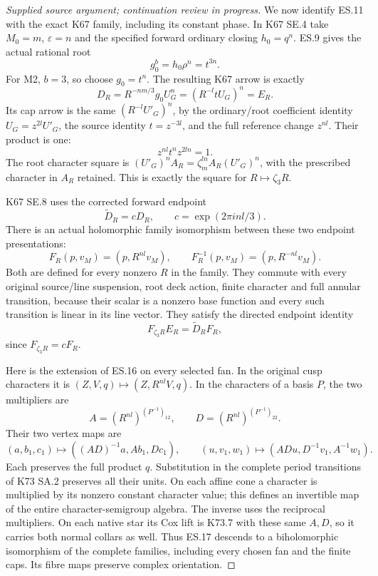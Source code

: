 \begin{proof}[Supplied source argument; continuation review in progress]
We now identify ES.11 with the exact K67 family, including its
constant phase. In K67 SE.4 take \(M_0=m\), \(\varepsilon=n\)
and the specified forward ordinary closing \(h_0=q^n\).
ES.9 gives the actual rational root
\[
 g_0^b=h_0\rho^n=t^{3n}.
 \tag{ES.12}
\]
For M2, \(b=3\), so choose \(g_0=t^n\). The resulting K67
arrow is exactly
\[
 D_R=R^{-nm/3}g_0U_G^n=(R^{-l}tU_G)^n=E_R.
 \tag{ES.13}
\]
Its cap arrow is the same \((R^{-l}U'_G)^n\), by the
ordinary/root coefficient identity \(U_G=z^{2l}U'_G\),
the source identity \(t=z^{-3l}\), and the full reference
change \(z^{nl}\). Their product is one:
\[
 z^{nl}t^nz^{2ln}=1 .
 \tag{ES.14}
\]
The root character square is
\((U'_G)^nA_R=\zeta_m^{ln}A_R(U'_G)^n\), with the
prescribed character in \(A_R\) retained. This is exactly
the square for \(R\mapsto\zeta_3R\).

K67 SE.8 uses the corrected forward endpoint
\[
 \widetilde D_R=cD_R,\qquad
 c=\exp(2\pi i nl/3).
 \tag{ES.15}
\]
There is an actual holomorphic family isomorphism between these
two endpoint presentations:
\[
 F_R(p,v_M)=(p,R^{nl}v_M),\qquad
 F_R^{-1}(p,v_M)=(p,R^{-nl}v_M).
 \tag{ES.16}
\]
Both are defined for every nonzero \(R\) in the family. They
commute with every original source/line suspension, root deck
action, finite character and full annular transition, because
their scalar is a nonzero base function and every such
transition is linear in its line vector. They satisfy the
directed endpoint identity
\[
 F_{\zeta_3R}E_R=\widetilde D_RF_R ,
 \tag{ES.17}
\]
since \(F_{\zeta_3R}=cF_R\).

Here is the extension of ES.16 on every selected fan. In the
original cusp characters it is \((Z,V,q)\mapsto
(Z,R^{nl}V,q)\). In the characters of a basis \(P\), the two
multipliers are
\[
 A=(R^{nl})^{(P^{-1})_{12}},\qquad
 D=(R^{nl})^{(P^{-1})_{22}}.
 \tag{ES.18}
\]
Their two vertex maps are
\[
 (a,b_1,c_1)\longmapsto((AD)^{-1}a,Ab_1,Dc_1),
 \qquad
 (u,v_1,w_1)\longmapsto(ADu,D^{-1}v_1,A^{-1}w_1).
 \tag{ES.19}
\]
Each preserves the full product \(q\). Substitution in the
complete period transitions of K73 SA.2 preserves all their
units. On each affine cone a character is multiplied by its
nonzero constant character value; this defines an invertible
map of the entire character-semigroup algebra. The inverse
uses the reciprocal multipliers. On each native star its Cox
lift is K73.7 with these same \(A,D\), so it carries both normal
collars as well. Thus ES.17 descends to a biholomorphic
isomorphism of the complete families, including every chosen
fan and the finite caps. Its fibre maps preserve complex
orientation.


\end{proof}
